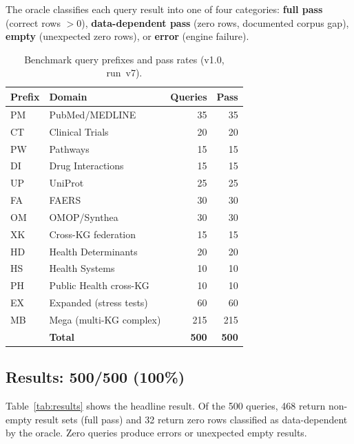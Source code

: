\documentclass[runningheads]{llncs}
\begin{document}
The oracle classifies each query result into one of four categories:
\textbf{full pass} (correct rows $> 0$),
\textbf{data-dependent pass} (zero rows, documented corpus gap),
\textbf{empty} (unexpected zero rows), or
\textbf{error} (engine failure).

\begin{table}[t]
\centering
\caption{Benchmark query prefixes and pass rates (v1.0, run~v7).}
\label{tab:prefixes}
\small
\begin{tabular}{@{}llrr@{}}
\toprule
\textbf{Prefix} & \textbf{Domain} & \textbf{Queries} & \textbf{Pass} \\
\midrule
PM  & PubMed/MEDLINE           & 35  & 35 \\
CT  & Clinical Trials          & 20  & 20 \\
PW  & Pathways                 & 15  & 15 \\
DI  & Drug Interactions        & 15  & 15 \\
UP  & UniProt                  & 25  & 25 \\
FA  & FAERS                    & 30  & 30 \\
OM  & OMOP/Synthea             & 30  & 30 \\
XK  & Cross-KG federation      & 15  & 15 \\
HD  & Health Determinants      & 20  & 20 \\
HS  & Health Systems           & 10  & 10 \\
PH  & Public Health cross-KG   & 10  & 10 \\
EX  & Expanded (stress tests)  & 60  & 60 \\
MB  & Mega (multi-KG complex)  & 215 & 215 \\
\midrule
    & \textbf{Total}           & \textbf{500} & \textbf{500} \\
\bottomrule
\end{tabular}
\end{table}

\subsection{Results: 500/500 (100\%)}

Table~\ref{tab:results} shows the headline result.  Of the 500
queries, 468 return non-empty result sets (full pass) and 32 return
zero rows classified as data-dependent by the oracle.  Zero queries
produce errors or unexpected empty results.
\end{document}
